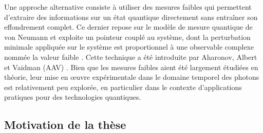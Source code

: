 \begin{onehalfspace}
    \noindent Une approche alternative consiste à utiliser des mesures 
    faibles qui permettent d’extraire des informations sur un état 
    quantique directement sans entraîner son effondrement complet. Ce 
    dernier repose sur le modèle de mesure quantique de von Neumann 
    \cite{vonNeumann} et exploite un pointeur couplé au système, 
    dont la perturbation minimale appliquée sur le système est proportionnel à une 
    observable complexe nommée la \guillemetleft valeur faible \guillemetright. 
    Cette technique a été introduite par Aharonov, Albert et Vaidman 
    (AAV) \cite{Aharonov}. Bien que les mesures faibles aient été 
    largement étudiées en théorie, leur mise en œuvre expérimentale dans 
    le domaine temporel des photons est relativement peu explorée, en 
    particulier dans le contexte d’applications pratiques pour des 
    technologies quantiques.

\end{onehalfspace}



\subsection{Motivation de la thèse}

